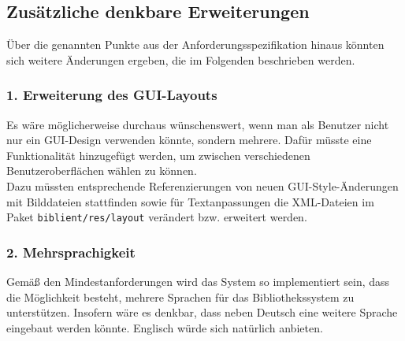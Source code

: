 \documentclass[fontsize=12pt,paper=a4,twoside]{scrartcl}
\begin{document}
\subsection*{Zusätzliche denkbare Erweiterungen}

Über die genannten Punkte aus der Anforderungsspezifikation hinaus könnten sich weitere Änderungen ergeben, die im Folgenden beschrieben werden.

\subsubsection*{1. Erweiterung des GUI-Layouts}

Es wäre möglicherweise durchaus wünschenswert, wenn man als Benutzer nicht nur ein GUI-Design verwenden könnte, sondern mehrere. Dafür müsste eine Funktionalität hinzugefügt werden, um zwischen verschiedenen Benutzeroberflächen wählen zu können. \\
Dazu müssten entsprechende Referenzierungen von neuen GUI-Style-Änderungen mit Bilddateien stattfinden sowie für Textanpassungen die XML-Dateien im Paket \texttt{biblient/res/layout} verändert bzw. erweitert werden. 

\subsubsection*{2. Mehrsprachigkeit}

Gemäß den Mindestanforderungen wird das System so implementiert sein, dass die Möglichkeit besteht, mehrere Sprachen für das Bibliothekssystem zu unterstützen. Insofern wäre es denkbar, dass neben Deutsch eine weitere Sprache eingebaut werden könnte. Englisch würde sich natürlich anbieten.
\end{document}
